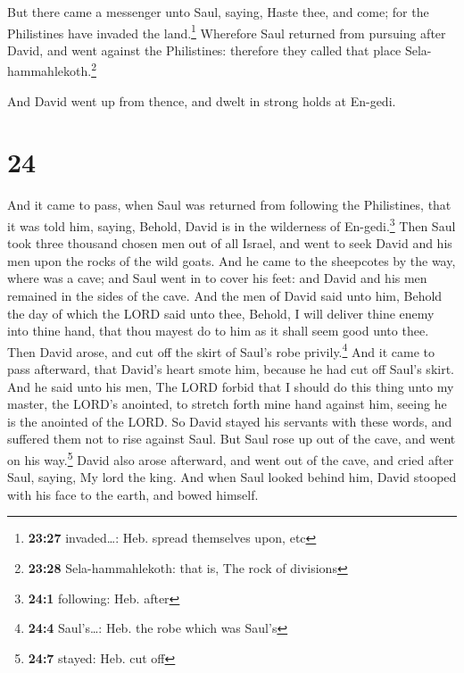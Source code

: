  But there came a messenger unto Saul, saying, Haste
thee, and come; for the Philistines have invaded the land.\footnote{\textbf{23:27}
  invaded\ldots: Heb. spread themselves upon, etc} 
Wherefore Saul returned from pursuing after David, and went against the
Philistines: therefore they called that place
Sela-hammahlekoth.\footnote{\textbf{23:28} Sela-hammahlekoth: that is,
  The rock of divisions}

 And David went up from thence, and dwelt in strong holds
at En-gedi.

\hypertarget{section-23}{%
\section{24}\label{section-23}}

 And it came to pass, when Saul was returned from
following the Philistines, that it was told him, saying, Behold, David
is in the wilderness of En-gedi.\footnote{\textbf{24:1} following: Heb.
  after}  Then Saul took three thousand chosen men out of
all Israel, and went to seek David and his men upon the rocks of the
wild goats.  And he came to the sheepcotes by the way,
where was a cave; and Saul went in to cover his feet: and David and his
men remained in the sides of the cave.  And the men of
David said unto him, Behold the day of which the LORD said unto thee,
Behold, I will deliver thine enemy into thine hand, that thou mayest do
to him as it shall seem good unto thee. Then David arose, and cut off
the skirt of Saul's robe privily.\footnote{\textbf{24:4} Saul's\ldots:
  Heb. the robe which was Saul's}  And it came to pass
afterward, that David's heart smote him, because he had cut off Saul's
skirt.  And he said unto his men, The LORD forbid that I
should do this thing unto my master, the LORD's anointed, to stretch
forth mine hand against him, seeing he is the anointed of the LORD.
 So David stayed his servants with these words, and
suffered them not to rise against Saul. But Saul rose up out of the
cave, and went on his way.\footnote{\textbf{24:7} stayed: Heb. cut off}
 David also arose afterward, and went out of the cave, and
cried after Saul, saying, My lord the king. And when Saul looked behind
him, David stooped with his face to the earth, and bowed himself.

